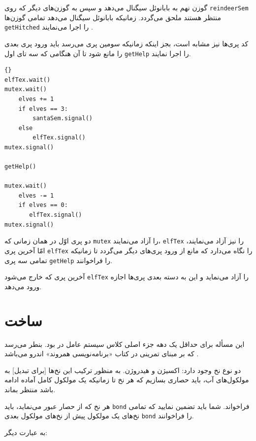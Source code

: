 \documentclass{book}
\begin{document}
     گوزن نهم به بابانوئل سیگنال می‌دهد و سپس به گوزن‌های دیگر که روی  {\tt reindeerSem} منتظر هستند ملحق می‌گردد. 
     زمانیکه بابانوئل سیگنال می‌دهد تمامی گوزن‌ها {\tt getHitched} را اجرا می‌نمایند .
    

    کد پری‌‌ها نیز مشابه است، بجز اینکه زمانیکه سومین پری می‌رسد باید ورود پری بعدی را مانع شود تا آن هنگامی که سه تای اول {\tt getHelp} را اجرا نمایند. 

\newpage
\begin{latin}
\begin{lstlisting}[title=\rl{راه حل مسأله بابانوئل (پری‌ها)}]{}
elfTex.wait()
mutex.wait()
    elves += 1
    if elves == 3:
        santaSem.signal()
    else
        elfTex.signal()
mutex.signal()

getHelp()

mutex.wait()
    elves -= 1
    if elves == 0:
       elfTex.signal()
mutex.signal()
\end{lstlisting}
\end{latin}

    دو پری اوّل در همان زمانی که {\tt mutex} را  آزاد می‌نمایند، {\tt elfTex} را نیز آزاد می‌نمایند،‌ امّا آخرین پری  {\tt elfTex} را نگاه می‌دارد که 
    مانع از ورود پری‌های دیگر می‌گردد تا زمانیکه تمامی سه پری {\tt getHelp} را فراخوانند. 

    آخرین پری که خارج می‌شود {\tt elfTex} را آزاد می‌نماید و این به دسته‌ بعدی پری‌ها اجازه ورود می‌دهد. 
    

\newpage
\section{ساخت  }
\label{water}

    این مسأله برای حداقل یک دهه جزء اصلی کلاس سیستم عامل در   بود. بنطر می‌رسد که بر مبنای تمرینی 
    در کتاب «برنامه‌نویسی همروند» اندرو می‌باشد \cite{andrews}.

    دو نوع نخ وجود دارد: اکسیژن و هیدروژن. به منظور ترکیب این نخ‌ها [برای تبدیل] به مولکول‌های آب، باید حصاری بسازیم که هر نخ تا زمانیکه یک مولکول کامل 
    آماده ادامه باشد منتظر بماند. 

    هر نخ که از حصار عبور می‌نماید، باید {\tt bond} فراخواند. شما باید تضمین نمایید که تمامی نخ‌های یک مولکول پیش از نخ‌های مولکول بعدی {\tt bond} 
    را فراخوانند. 


    به عبارت دیگر: 
\end{document}
